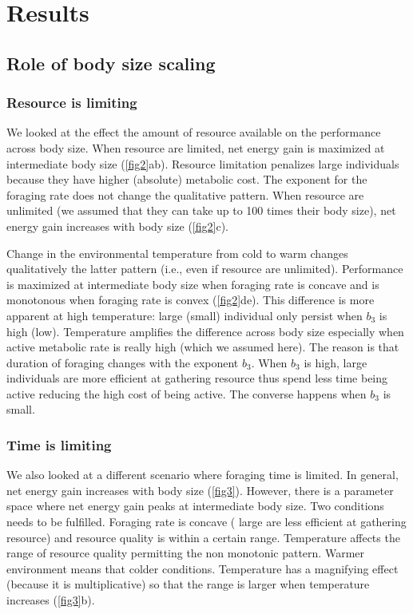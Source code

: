 \section*{Results}
\subsection*{Role of body size scaling}
\subsubsection*{Resource is limiting}
We looked at the effect the amount of resource available on the performance across body size.
  When resource are limited,  net energy gain is maximized at intermediate body size (\cref{fig2}ab).
 Resource limitation penalizes large individuals because they have higher (absolute) metabolic cost. 
 The exponent for the foraging rate does not change the qualitative pattern.
 When resource are unlimited (we assumed that they can take up to 100 times their body size), net energy gain increases with body size (\cref{fig2}c).

Change in the environmental temperature from cold to warm changes qualitatively the latter pattern (i.e., even if resource are unlimited).
Performance is maximized at intermediate body size when foraging rate is concave and is monotonous when foraging rate is convex (\cref{fig2}de).
This difference is more apparent at high temperature: large (small) individual only persist when $b_3$ is high (low).  
Temperature amplifies the difference across body size especially when active metabolic rate is really high (which we assumed here).
The reason is that duration of foraging changes with  the exponent $b_3$.
When $b_3$ is high, large individuals are more efficient at gathering resource thus spend less time being active reducing the high cost of being active.
The converse happens when $b_3$ is small.
\subsubsection*{Time is limiting}
We also looked at a different scenario where foraging time is limited.
 In general, net energy gain increases with body size (\cref{fig3}).
 However, there is a parameter space where net energy gain peaks at intermediate body size.
 Two conditions needs to be fulfilled.
 Foraging rate is concave ( large are less efficient at gathering resource) and resource quality is within a certain range.
 Temperature affects the range of resource quality permitting the non monotonic pattern.
 Warmer environment means  that colder conditions.
 Temperature has a magnifying effect (because it is multiplicative) so that the range is larger when temperature increases (\cref{fig3}b).
 
